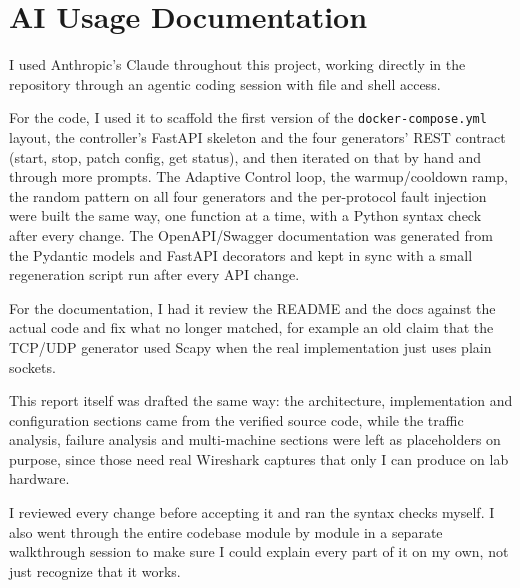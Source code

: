 \section{AI Usage Documentation}

I used Anthropic's Claude throughout this project, working directly in the
repository through an agentic coding session with file and shell access.

For the code, I used it to scaffold the first version of the
\texttt{docker-compose.yml} layout, the controller's FastAPI skeleton and the
four generators' REST contract (start, stop, patch config, get status), and
then iterated on that by hand and through more prompts. The Adaptive Control
loop, the warmup/cooldown ramp, the random pattern on all four generators and
the per-protocol fault injection were built the same way, one function at a
time, with a Python syntax check after every change. The OpenAPI/Swagger
documentation was generated from the Pydantic models and FastAPI decorators
and kept in sync with a small regeneration script run after every API change.

For the documentation, I had it review the README and the docs against the
actual code and fix what no longer matched, for example an old claim that the
TCP/UDP generator used Scapy when the real implementation just uses plain
sockets.

This report itself was drafted the same way: the architecture, implementation
and configuration sections came from the verified source code, while the
traffic analysis, failure analysis and multi-machine sections were left as
placeholders on purpose, since those need real Wireshark captures that only I
can produce on lab hardware.

I reviewed every change before accepting it and ran the syntax checks myself.
I also went through the entire codebase module by module in a separate
walkthrough session to make sure I could explain every part of it on my own,
not just recognize that it works.

